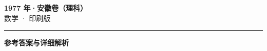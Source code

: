\documentclass[zihao=5, a4paper]{ctexart}
\begin{document}
\begin{center}
  {\Large\bfseries 1977 年·安徽卷（理科）}\\[4pt]
  {\large 数学 · 印刷版}
\end{center}
\medskip
{}

\par\bigskip\hrule\bigskip
{}
\begin{center}{\large\bfseries 参考答案与详细解析}\end{center}
\smallskip

\end{document}
